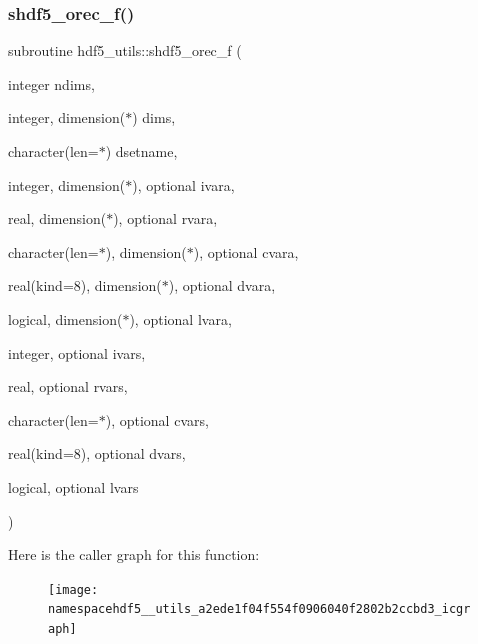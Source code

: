 \subsubsection{\texorpdfstring{shdf5\+\_\+orec\+\_\+f()}{shdf5\_orec\_f()}}
{\footnotesize\ttfamily subroutine hdf5\+\_\+utils\+::shdf5\+\_\+orec\+\_\+f (\begin{DoxyParamCaption}\item[{integer}]{ndims,  }\item[{integer, dimension($\ast$)}]{dims,  }\item[{character(len=$\ast$)}]{dsetname,  }\item[{integer, dimension($\ast$), optional}]{ivara,  }\item[{real, dimension($\ast$), optional}]{rvara,  }\item[{character(len=$\ast$), dimension($\ast$), optional}]{cvara,  }\item[{real(kind=8), dimension($\ast$), optional}]{dvara,  }\item[{logical, dimension($\ast$), optional}]{lvara,  }\item[{integer, optional}]{ivars,  }\item[{real, optional}]{rvars,  }\item[{character(len=$\ast$), optional}]{cvars,  }\item[{real(kind=8), optional}]{dvars,  }\item[{logical, optional}]{lvars }\end{DoxyParamCaption})}

Here is the caller graph for this function\+:
\nopagebreak
\begin{figure}[H]
\begin{center}
\leavevmode
\texttt{[image: namespacehdf5\_\_utils\_a2ede1f04f554f0906040f2802b2ccbd3\_icgraph]}
\end{center}
\end{figure}
